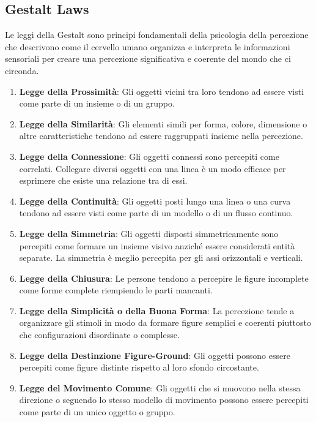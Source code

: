 \subsection{Gestalt Laws}
Le leggi della Gestalt sono principi fondamentali della psicologia della percezione che descrivono come il cervello umano organizza e interpreta le informazioni sensoriali 
per creare una percezione significativa e coerente del mondo che ci circonda. 
\begin{enumerate}
    \item \textbf{Legge della Prossimità}: Gli oggetti vicini tra loro tendono ad essere visti come parte di un insieme o di un gruppo.
    
    \item \textbf{Legge della Similarità}: Gli elementi simili per forma, colore, dimensione o altre caratteristiche tendono ad essere raggruppati insieme nella percezione.
    
    \item \textbf{Legge della Connessione}: Gli oggetti connessi sono percepiti come correlati.
        Collegare diversi oggetti con una linea è un modo efficace per esprimere che esiste una relazione tra di essi.
    
    \item \textbf{Legge della Continuità}: Gli oggetti posti lungo una linea o una curva tendono ad essere visti come parte di un modello o di un flusso continuo.
    
    \item \textbf{Legge della Simmetria}: Gli oggetti disposti simmetricamente sono percepiti come formare un insieme visivo anziché essere considerati entità separate.
     La simmetria è meglio percepita per gli assi orizzontali e verticali.
    
    \item \textbf{Legge della Chiusura}: Le persone tendono a percepire le figure incomplete come forme complete riempiendo le parti mancanti.
    
    \item \textbf{Legge della Simplicità o della Buona Forma}: La percezione tende a organizzare gli stimoli in modo da formare figure semplici e coerenti piuttosto che configurazioni disordinate o complesse.
    
    \item \textbf{Legge della Destinzione Figure-Ground}: Gli oggetti possono essere percepiti come figure distinte rispetto al loro sfondo circostante.
    
    \item \textbf{Legge del Movimento Comune}: Gli oggetti che si muovono nella stessa direzione o seguendo lo stesso modello di movimento possono essere percepiti come parte di un unico oggetto o gruppo.
  \end{enumerate}
